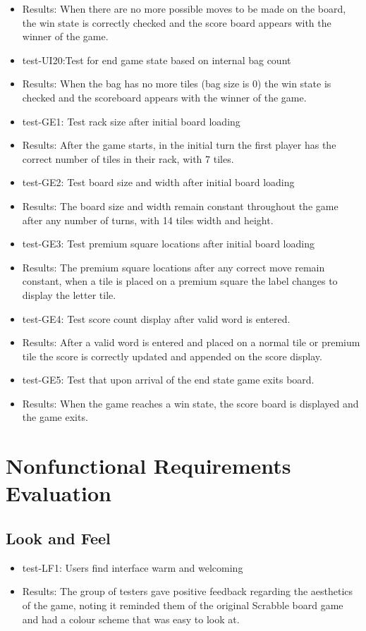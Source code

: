 \documentclass[12pt, titlepage]{article}
\begin{document}
\begin{itemize}
    \item Results: When there are no more possible moves to be made on the board, the win state is correctly checked and the score board appears with the winner of the game.
    \item test-UI20:Test for end game state based on internal bag count
    \item Results: When the bag has no more tiles (bag size is 0) the win state is checked and the scoreboard appears with the winner of the game.
    \item test-GE1: Test rack size after initial board loading
    \item Results: After the game starts, in the initial turn the first player has the correct number of tiles in their rack, with 7 tiles.
    \item test-GE2: Test board size and width after initial board loading
    \item Results: The board size and width remain constant throughout the game after any number of turns, with 14 tiles width and height.
    \item test-GE3: Test premium square locations after initial board loading
    \item Results: The premium square locations after any correct move remain constant, when a tile is placed on a premium square the label changes to display the letter tile.
    \item test-GE4: Test score count display after valid word is entered.
    \item Results: After a valid word is entered and placed on a normal tile or premium tile the score is correctly updated and appended on the score display.
    \item test-GE5: Test that upon arrival of the end state game exits board.
    \item Results: When the game reaches a win state, the score board is displayed and the game exits.
\end{itemize}

\section{Nonfunctional Requirements Evaluation}

\subsection{Look and Feel}
\begin{itemize}
    \item test-LF1: Users find interface warm and welcoming
    \item Results: The group of testers gave positive feedback regarding the aesthetics of the game, noting it reminded them of the original Scrabble board game and had a colour scheme that was easy to look at. 
\end{itemize}
\end{document}
